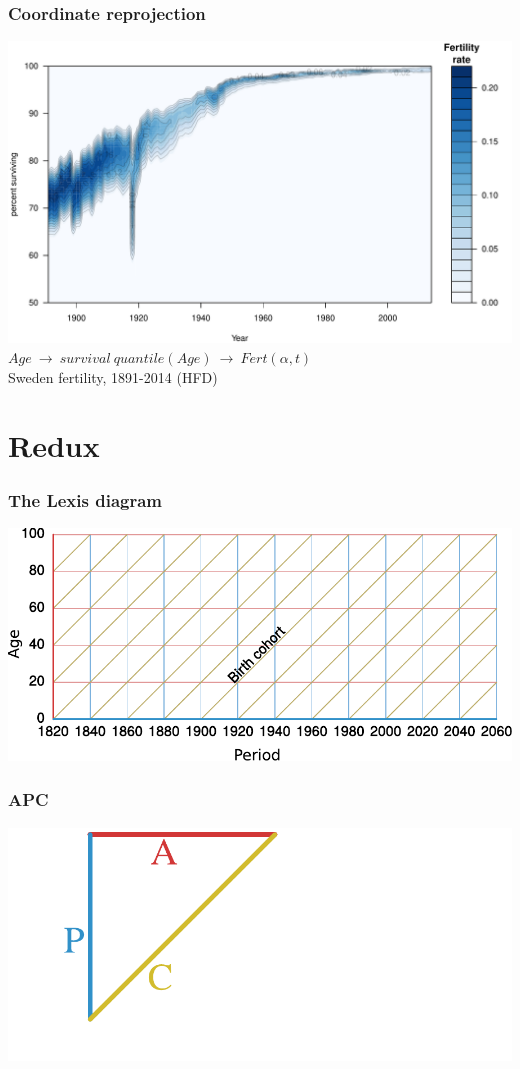 \documentclass[20pt]{beamer}
\begin{document}
\begin{frame}
\frametitle{Coordinate reprojection}
\includegraphics[scale=.9]{Figures/FertQuant.pdf}\\
$Age~\rightarrow~survival~quantile(Age)~\rightarrow~Fert(\alpha,t)$\\
Sweden fertility, 1891-2014 (HFD)
\end{frame}

\section{Redux}
\begin{frame}
\frametitle{The Lexis diagram}
\centering
\includegraphics[scale=1.5]{Figures/LexisStripped0.pdf}\\
\end{frame}

\begin{frame}
\frametitle{APC}
\centering
\includegraphics[scale=1.5]{Figures/LexisStripped1.pdf}\\
\end{frame}
\end{document}
